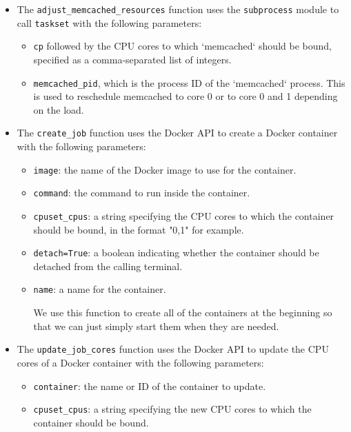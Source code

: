 \begin{enumerate}
\begin{itemize}
\begin{itemize}
    \item The \texttt{adjust\_memcached\_resources} function uses the \texttt{subprocess} module to call \texttt{taskset} with the following parameters:
      \begin{itemize}
      \item \texttt{\-cp} followed by the CPU cores to which `memcached` should be bound, specified as a comma-separated list of integers.
      \item \texttt{memcached\_pid}, which is the process ID of the `memcached` process.
    This is used to reschedule memcached to core 0 or to core 0 and 1 depending on the load.
    \end{itemize}
      
    \item The \texttt{create\_job} function uses the Docker API to create a Docker container with the following parameters:
      \begin{itemize}
      \item \texttt{image}: the name of the Docker image to use for the container.
      \item \texttt{command}: the command to run inside the container.
      \item \texttt{cpuset\_cpus}: a string specifying the CPU cores to which the container should be bound, in the format "0,1" for example.
      \item \texttt{detach=True}: a boolean indicating whether the container should be detached from the calling terminal.
      \item \texttt{name}: a name for the container.
    
      We use this function to create all of the containers at the beginning so that we can just simply start them when they are needed.
    \end{itemize}
      
    \item The \texttt{update\_job\_cores} function uses the Docker API to update the CPU cores of a Docker container with the following parameters:
      \begin{itemize}
      \item \texttt{container}: the name or ID of the container to update.
      \item \texttt{cpuset\_cpus}: a string specifying the new CPU cores to which the container should be bound. 
    

\end{itemize}
\end{itemize}
\end{itemize}
\end{enumerate}
